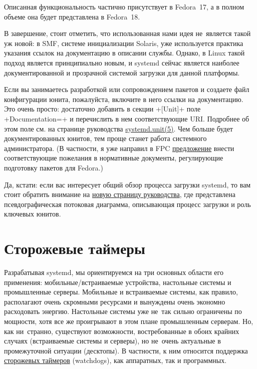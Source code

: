 \documentclass[10pt,oneside,a4paper]{article}
\begin{document}
Описанная функциональность частично присутствует в Fedora~17, а в полном
объеме она будет представлена в Fedora~18.

В завершение, стоит отметить, что использованная нами идея не~является такой уж
новой: в SMF, системе инициализации Solaris, уже используется практика
указания ссылок на документацию в описании службы. Однако, в Linux такой
подход является принципиально новым, и systemd сейчас является наиболее
документированной и прозрачной системой загрузки для данной платформы.

Если вы занимаетесь разработкой или сопровождением пакетов и создаете файл
конфигурации юнита, пожалуйста, включите в него ссылки на документацию. Это
очень просто: достаточно добавить в секции +[Unit]+ поле +Documentation=+ и
перечислить в нем соответствующие URI. Подробнее об этом поле см. на странице
руководства
\href{http://www.freedesktop.org/software/systemd/man/systemd.unit.html}{systemd.unit(5)}.
Чем больше будет документированных юнитов, тем проще станет работа системного
администратора. (В частности, я уже направил в FPC
\href{https://fedorahosted.org/fpc/ticket/192}{предложение} внести
соответствующие пожелания в нормативные документы, регулирующие подготовку
пакетов для Fedora.)

Да, кстати: если вас интересует общий обзор процесса загрузки systemd, то вам
стоит обратить внимание на
\href{http://www.freedesktop.org/software/systemd/man/bootup.html}{новую
страницу руководства}, где представлена псевдографическая потоковая диаграмма,
описывающая процесс загрузки и роль ключевых юнитов.

\section{Сторожевые таймеры}

Разрабатывая systemd, мы ориентируемся на три основных области его применения:
мобильные/встраиваемые устройства, настольные системы и промышленные серверы.
Мобильные и встраиваемые системы, как правило, располагают очень скромными
ресурсами и вынуждены очень экономно расходовать энергию. Настольные системы
уже не~так сильно ограничены по мощности, хотя все же проигрывают в
этом плане промышленным серверам. Но, как ни~странно, существуют
возможности, востребованные в обоих крайних случаях (встраиваемые системы и
серверы), но не~очень актуальные в промежуточной ситуации (десктопы). В
частности, к ним относится поддержка
\href{http://ru.wikipedia.org/wiki/Watchdog}{сторожевых таймеров} (watchdogs),
как аппаратных, так и программных.
\end{document}
